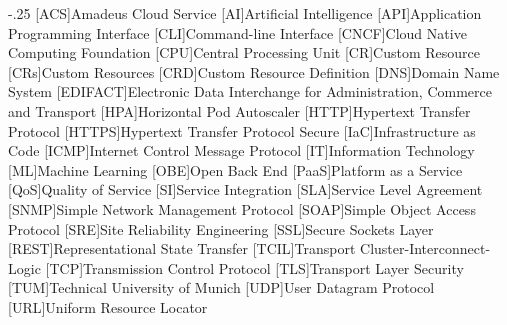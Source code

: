 \documentclass[headsepline,footsepline,footinclude=false,oneside,fontsize=11pt,paper=a4,listof=totoc,bibliography=totoc]{scrbook} %
\begin{document}


\frontmatter{}





\tableofcontents{}

\mainmatter{}

% 










\appendix{}


\begin{acronym}
	\itemsep-.25\baselineskip
	[ACS]{Amadeus Cloud Service}
	[AI]{Artificial Intelligence}
	[API]{Application Programming Interface}
	[CLI]{Command-line Interface}
	[CNCF]{Cloud Native Computing Foundation}
	[CPU]{Central Processing Unit}
	[CR]{Custom Resource}
	[CRs]{Custom Resources}
	[CRD]{Custom Resource Definition}
	[DNS]{Domain Name System}
	[EDIFACT]{Electronic Data Interchange for Administration, Commerce and Transport}
	[HPA]{Horizontal Pod Autoscaler}
	[HTTP]{Hypertext Transfer Protocol}
	[HTTPS]{Hypertext Transfer Protocol Secure}
	[IaC]{Infrastructure as Code}
	[ICMP]{Internet Control Message Protocol}
	[IT]{Information Technology}
	[ML]{Machine Learning}
	[OBE]{Open Back End}
	[PaaS]{Platform as a Service}
	[QoS]{Quality of Service}
	[SI]{Service Integration}
	[SLA]{Service Level Agreement}
	[SNMP]{Simple Network Management Protocol}
	[SOAP]{Simple Object Access Protocol}
	[SRE]{Site Reliability Engineering}
	[SSL]{Secure Sockets Layer}
	[REST]{Representational State Transfer}
	[TCIL]{Transport Cluster-Interconnect-Logic}
	[TCP]{Transmission Control Protocol}
	[TLS]{Transport Layer Security}
	[TUM]{Technical University of Munich}
	[UDP]{User Datagram Protocol}
	[URL]{Uniform Resource Locator}
\end{acronym}

\listoffigures{}
\printbibliography{}
\end{document}

